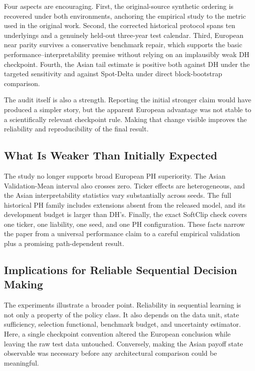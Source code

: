\documentclass[conference]{IEEEtran}
\begin{document}
Four aspects are encouraging. First, the original-source synthetic ordering is
recovered under both environments, anchoring the empirical study to the metric
used in the original work. Second, the corrected historical protocol spans ten
underlyings and a genuinely held-out three-year test calendar. Third, European
near parity survives a conservative benchmark repair, which supports the basic
performance--interpretability premise without relying on an implausibly weak DH
checkpoint. Fourth, the Asian tail estimate is positive both against DH under
the targeted sensitivity and against Spot-Delta under direct block-bootstrap
comparison.

The audit itself is also a strength. Reporting the initial stronger claim would
have produced a simpler story, but the apparent European advantage was not
stable to a scientifically relevant checkpoint rule. Making that change
visible improves the reliability and reproducibility of the final result.

\subsection{What Is Weaker Than Initially Expected}

The study no longer supports broad European PH superiority. The Asian
Validation-Mean interval also crosses zero. Ticker effects are heterogeneous,
and the Asian interpretability statistics vary substantially across seeds.
The full historical PH family includes extensions absent from the released
model, and its development budget is larger than DH's. Finally, the exact
SoftClip check covers one ticker, one liability, one seed, and one PH
configuration. These facts narrow the paper from a universal performance claim
to a careful empirical validation plus a promising path-dependent result.

\subsection{Implications for Reliable Sequential Decision Making}

The experiments illustrate a broader point. Reliability in sequential learning
is not only a property of the policy class. It also depends on the data unit,
state sufficiency, selection functional, benchmark budget, and uncertainty
estimator. Here, a single checkpoint convention altered the European
conclusion while leaving the raw test data untouched. Conversely, making the
Asian payoff state observable was necessary before any architectural
comparison could be meaningful.
\end{document}
